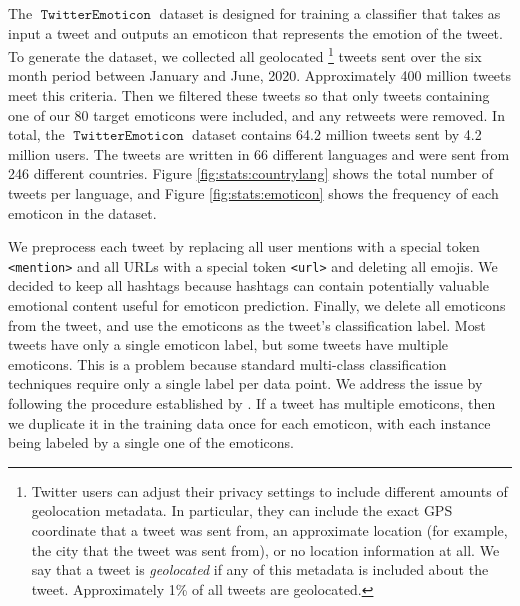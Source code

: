 \documentclass[11pt]{article}
\newcommand{\defn}[1]{\emph{{#1}}}
\newcommand{\bertmoji}{\texttt{BERTmoticon}}
\DeclareMathOperator{\emoticon}{\texttt{TwitterEmoticon}}
\begin{document}
The $\emoticon$ dataset is designed for training a classifier that takes as input a tweet and outputs an emoticon that represents the emotion of the tweet.
To generate the dataset, 
we collected all geolocated%
\footnote{
Twitter users can adjust their privacy settings to include different amounts of geolocation metadata.
In particular, they can include the exact GPS coordinate that a tweet was sent from,
an approximate location (for example, the city that the tweet was sent from),
or no location information at all.
We say that a tweet is \defn{geolocated} if any of this metadata is included about the tweet.
Approximately 1\% of all tweets are geolocated.
} 
tweets sent over the six month period between January and June, 2020.
Approximately 400 million tweets meet this criteria.
Then we filtered these tweets so that only tweets containing one of our 80 target emoticons were included,
and any retweets were removed.
In total, the $\emoticon$ dataset contains 64.2 million tweets sent by 4.2 million users.
The tweets are written in 66 different languages and were sent from 246 different countries.
Figure \ref{fig:stats:countrylang} shows the total number of tweets per language,
and Figure \ref{fig:stats:emoticon} shows the frequency of each emoticon in the dataset.

We preprocess each tweet by replacing all user mentions with a special token \texttt{<mention>} and all URLs with a special token \texttt{<url>} and deleting all emojis.
We decided to keep all hashtags because hashtags can contain potentially valuable emotional content useful for emoticon prediction.
Finally, we delete all emoticons from the tweet,
and use the emoticons as the tweet's classification label.
Most tweets have only a single emoticon label, but some tweets have multiple emoticons.
This is a problem because standard multi-class classification techniques require only a single label per data point.
We address the issue by following the procedure established by \citep{felbo2017using}.
If a tweet has multiple emoticons,
then we duplicate it in the training data once for each emoticon,
with each instance being labeled by a single one of the emoticons.
\end{document}
